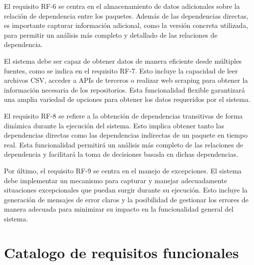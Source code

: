 El requisito RF-6 se centra en el almacenamiento de datos adicionales sobre la relación de dependencia
entre los paquetes. Además de las dependencias directas, es importante capturar información adicional,
como la versión concreta utilizada, para permitir un análisis más completo y detallado de las relaciones
de dependencia.

El sistema debe ser capaz de obtener datos de manera eficiente desde múltiples fuentes, como se indica
en el requisito RF-7. Esto incluye la capacidad de leer archivos CSV, acceder a APIs de terceros o
realizar web scraping para obtener la información necesaria de los repositorios. Esta funcionalidad
flexible garantizará una amplia variedad de opciones para obtener los datos requeridos por el sistema.

El requisito RF-8 se refiere a la obtención de dependencias transitivas de forma dinámica durante la
ejecución del sistema. Esto implica obtener tanto las dependencias directas como las dependencias
indirectas de un paquete en tiempo real. Esta funcionalidad permitirá un análisis más completo de las
relaciones de dependencia y facilitará la toma de decisiones basada en dichas dependencias.

Por último, el requisito RF-9 se centra en el manejo de excepciones. El sistema debe implementar un
mecanismo para capturar y manejar adecuadamente situaciones excepcionales que puedan surgir durante su
ejecución. Esto incluye la generación de mensajes de error claros y la posibilidad de gestionar los
errores de manera adecuada para minimizar su impacto en la funcionalidad general del sistema.

\section{Catalogo de requisitos funcionales}

